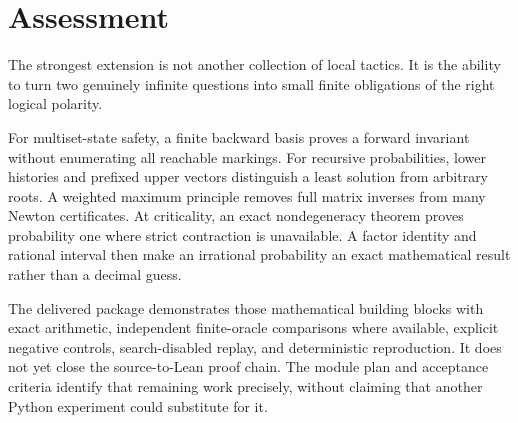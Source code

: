 \section{Assessment}
The strongest extension is not another collection of local tactics. It is the ability to turn two genuinely infinite questions into small finite obligations of the right logical polarity.

For multiset-state safety, a finite backward basis proves a forward invariant without enumerating all reachable markings. For recursive probabilities, lower histories and prefixed upper vectors distinguish a least solution from arbitrary roots. A weighted maximum principle removes full matrix inverses from many Newton certificates. At criticality, an exact nondegeneracy theorem proves probability one where strict contraction is unavailable. A factor identity and rational interval then make an irrational probability an exact mathematical result rather than a decimal guess.

The delivered package demonstrates those mathematical building blocks with exact arithmetic, independent finite-oracle comparisons where available, explicit negative controls, search-disabled replay, and deterministic reproduction. It does not yet close the source-to-Lean proof chain. The module plan and acceptance criteria identify that remaining work precisely, without claiming that another Python experiment could substitute for it.
